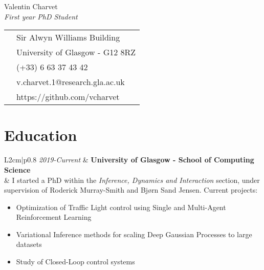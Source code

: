 \documentclass[a4paper,10.5pt]{article}
\begin{document}
	\vspace{1cm}
	\begin{paracol}{2}
		\begin{leftcolumn}
			\centering
			{\huge Valentin Charvet } \\
			\vspace{0.2cm}
			\Large \textit{First year PhD Student}%
		\end{leftcolumn}
		
		\begin{rightcolumn}
			\colorbox{shade}{
				\begin{tabular}{c|l}
						\faHome & \large Sir Alwyn Williams Building \\ & University of Glasgow - G12 8RZ \\
						\faPhoneSquare & \large (+33) 6 63 37 43 42 \\
						\faEnvelope &\large v.charvet.1@research.gla.ac.uk \\
						\faGithub &\large https://github.com/vcharvet \\
				\end{tabular}
			}
	
	\end{rightcolumn}
			
	\end{paracol}
	


	
	\section*{Education}
	\begin{tabular}{L{2cm}|p{0.8\linewidth}}
	\textit{2019-Current} & \textbf{University of Glasgow - School of Computing Science} \\
	& I started a PhD within the \textit{Inference, Dynamics and Interaction} section, under supervision of Roderick Murray-Smith and Bjørn Sand Jensen. 
	Current projects:
	\begin{itemize}
		\item Optimization of Traffic Light control using Single and Multi-Agent Reinforcement Learning
		\item Variational Inference methods for scaling Deep Gaussian Processes to large datasets
		\item Study of Closed-Loop control systems
	\end{itemize}
	\end{tabular}
	
\end{document}
